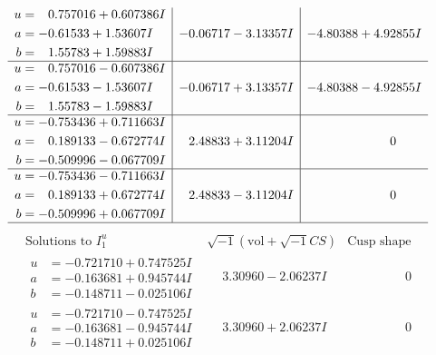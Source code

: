 \documentclass[1p]{elsarticle_modified}
\theoremstyle{definition}
\newcommand{\I}{\sqrt{-1}}
\begin{document}
$$\begin{array}{c|c|c}
\begin{aligned}
u &= \phantom{-}0.757016 + 0.607386 I \\
a &= -0.61533 + 1.53607 I \\
b &= \phantom{-}1.55783 + 1.59883 I\end{aligned}
 & -0.06717 - 3.13357 I & -4.80388 + 4.92855 I \\ \hline\begin{aligned}
u &= \phantom{-}0.757016 - 0.607386 I \\
a &= -0.61533 - 1.53607 I \\
b &= \phantom{-}1.55783 - 1.59883 I\end{aligned}
 & -0.06717 + 3.13357 I & -4.80388 - 4.92855 I \\ \hline\begin{aligned}
u &= -0.753436 + 0.711663 I \\
a &= \phantom{-}0.189133 - 0.672774 I \\
b &= -0.509996 - 0.067709 I\end{aligned}
 & \phantom{-}2.48833 + 3.11204 I & \phantom{-0.000000 } 0 \\ \hline\begin{aligned}
u &= -0.753436 - 0.711663 I \\
a &= \phantom{-}0.189133 + 0.672774 I \\
b &= -0.509996 + 0.067709 I\end{aligned}
 & \phantom{-}2.48833 - 3.11204 I & \phantom{-0.000000 } 0\\
 \hline 
 \end{array}$$\newpage$$\begin{array}{c|c|c}  
\text{Solutions to }I^u_{1}& \I (\text{vol} + \sqrt{-1}CS) & \text{Cusp shape}\\
 \hline 
\begin{aligned}
u &= -0.721710 + 0.747525 I \\
a &= -0.163681 + 0.945744 I \\
b &= -0.148711 - 0.025106 I\end{aligned}
 & \phantom{-}3.30960 - 2.06237 I & \phantom{-0.000000 } 0 \\ \hline\begin{aligned}
u &= -0.721710 - 0.747525 I \\
a &= -0.163681 - 0.945744 I \\
b &= -0.148711 + 0.025106 I\end{aligned}
 & \phantom{-}3.30960 + 2.06237 I & \phantom{-0.000000 } 0 \\ \hline\begin{aligned}

\end{aligned}
\end{array}$$
\end{document}
